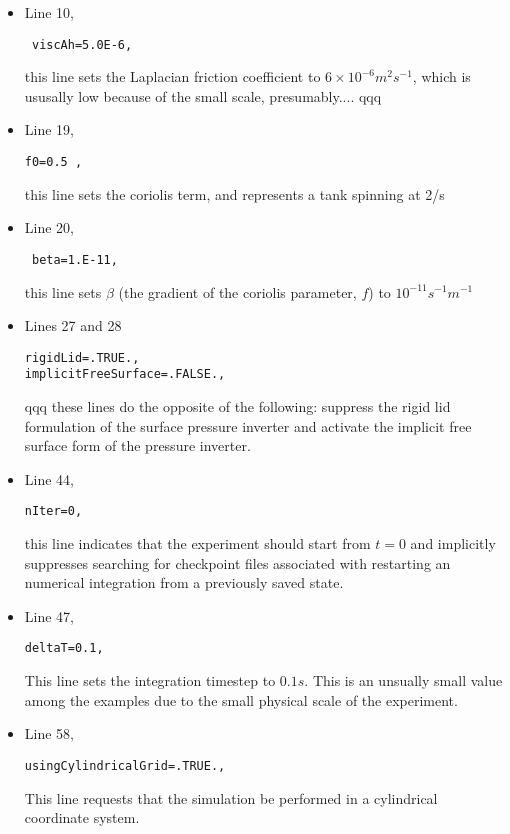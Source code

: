 \begin{itemize}

\item Line 10, \begin{verbatim} viscAh=5.0E-6, \end{verbatim} this line sets
the Laplacian friction coefficient to $6 \times 10^{-6} m^2s^{-1}$, 
which is ususally 
low because of the small scale, presumably.... qqq

\item Line 19, \begin{verbatim}f0=0.5 , \end{verbatim} this line sets the 
coriolis term, and represents a tank spinning at 2/s
\item Line 20, \begin{verbatim} beta=1.E-11, \end{verbatim} this line sets
$\beta$ (the gradient of the coriolis parameter, $f$) to $10^{-11} s^{-1}m^{-1}$

\item Lines 27 and 28
\begin{verbatim}
rigidLid=.TRUE.,
implicitFreeSurface=.FALSE.,
\end{verbatim}

qqq these lines do the opposite of the following: 
suppress the rigid lid formulation of the surface
pressure inverter and activate the implicit free surface form
of the pressure inverter.

\item Line 44,
\begin{verbatim}
nIter=0,
\end{verbatim}
this line indicates that the experiment should start from $t=0$
and implicitly suppresses searching for checkpoint files associated
with restarting an numerical integration from a previously saved state.

\item Line 47,
\begin{verbatim}
deltaT=0.1,
\end{verbatim}
This line sets the integration timestep to $0.1s$.  This is an unsually
small value among the examples due to the small physical scale of the 
experiment.

\item Line 58,
\begin{verbatim}
usingCylindricalGrid=.TRUE.,
\end{verbatim}
This line requests that the simulation be performed in a 
cylindrical coordinate system.


\end{itemize}
